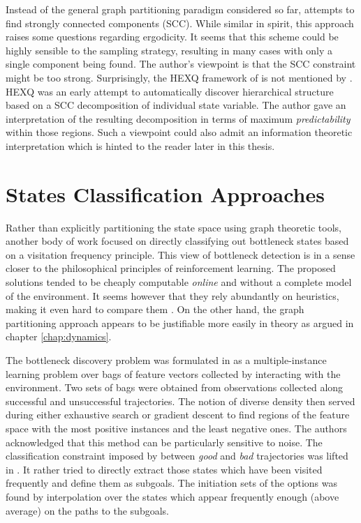 Instead of the general graph partitioning paradigm considered so far, \cite{Kazemitabar2009} attempts to find strongly connected components (SCC). While similar in spirit, this approach raises some questions regarding ergodicity. It seems that this scheme could be highly sensible to the sampling strategy, resulting in many cases with only a single component being found. The author's viewpoint is that the SCC constraint might be too strong. Surprisingly, the \textsc{HEXQ} framework of \cite{Hengst2002} is not mentioned by \cite{Kazemitabar2009}. \textsc{HEXQ} was an early attempt to automatically discover hierarchical structure based on a SCC decomposition of individual state variable. The author gave an interpretation of the resulting decomposition in terms of maximum \textit{predictability} within those regions. Such a viewpoint could also admit an information theoretic interpretation which is hinted to the reader later in this thesis.

\section{States Classification Approaches}
Rather than explicitly partitioning the state space using graph theoretic tools, another body of work focused on directly classifying out bottleneck states based on a visitation frequency principle. This view of bottleneck detection is in a sense closer to the philosophical principles of reinforcement learning. The proposed solutions tended to be cheaply computable \textit{online} and without a complete model of the environment. It seems however that they rely abundantly on heuristics, making it even hard to compare them . On the other hand, the graph partitioning approach appears to be justifiable more easily in theory as argued in chapter \ref{chap:dynamics}.

The bottleneck discovery problem was formulated in \cite{Mcgovern2001} as a multiple-instance learning problem over bags of feature vectors collected by interacting with the environment. Two sets of bags were obtained from observations collected along successful and unsuccessful trajectories. The notion of diverse density then served  during either exhaustive search or gradient descent to find regions of the feature space with the most positive instances and the least negative ones. The authors acknowledged  that this method can be particularly sensitive to noise. The classification constraint imposed  by \cite{Mcgovern2001} between \textit{good} and \textit{bad} trajectories was lifted in \cite{Stolle2002}. It rather tried to directly extract those states which have been visited frequently and define them as subgoals. The initiation sets of the options was found by interpolation over the states which appear frequently enough (above average) on the paths to the subgoals.

